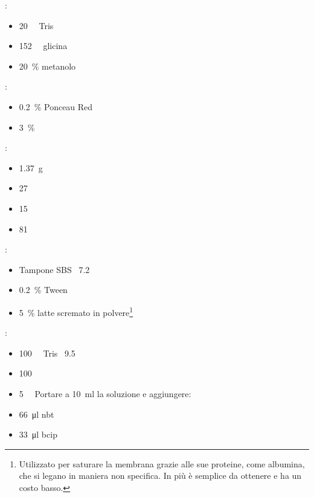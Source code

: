 \begin{itemize}
	\begin{multicols}{2}
		:
		\begin{itemize}[squareItem]
			\item \qty{20}{\milli\Molar} Tris
			\item \qty{152}{\milli\Molar} glicina
			\item \qty{20}{\percent} metanolo
		\end{itemize}
		:
		\begin{itemize}[squareItem]
			\item \qty{0.2}{\percent} Ponceau Red
			\item \qty{3}{\percent} 
		\end{itemize}
		:
		\begin{itemize}[squareItem]
			\item \qty{1.37}{\g} 
			\item \qty{27}{\milli\Molar} 
			\item \qty{15}{\milli\Molar} 
			\item \qty{81}{\milli\Molar} 
		\end{itemize}
		:
		\begin{itemize}[squareItem]
			\item Tampone SBS \pH\ \num{7.2}
			\item \qty{0.2}{\percent} Tween
			\item \qty{5}{\percent} latte scremato in polvere\footnote{Utilizzato per saturare la membrana grazie alle sue  proteine, come albumina, che si legano in maniera non specifica. In più è semplice da ottenere e ha un costo basso.}
		\end{itemize}
		:
		\begin{itemize}[squareItem]
			\item \qty{100}{\milli\Molar} Tris  \pH\ \num{9.5}
			\item \qty{100}{\milli\Molar} 
			\item \qty{5}{\milli\Molar} \newline
			      \hspace*{-.5cm}Portare a \qty{10}{\ml} la soluzione e aggiungere:
			\item \qty{66}{\micro\litre} \gls{nbt}
			\item \qty{33}{\micro\litre} \gls{bcip}
		\end{itemize}
	\end{multicols}
\end{itemize}
\endgroup

